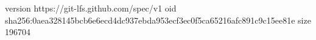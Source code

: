 version https://git-lfs.github.com/spec/v1
oid sha256:0aea328145bcb6e6ecd4dc937ebda953ecf3ec0f5ca65216afc891c9c15ee81e
size 196704
